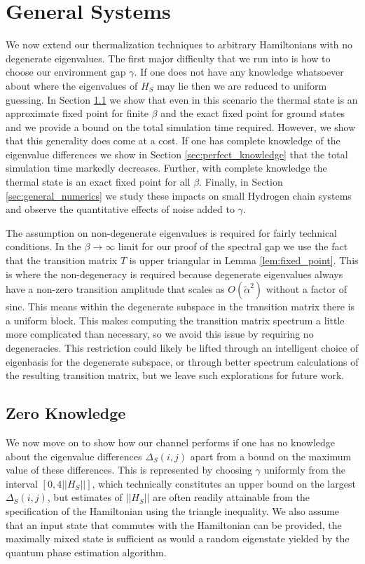 \documentclass[
 amsmath,amssymb,
 aps,
onecolumn, 
nofootinbib]{revtex4-2}
\newcommand{\norm}[1]{\left|\left| #1 \right|\right|}
\newcommand{\bigo}[1]{O\left(#1\right)}
\begin{document}
\section{General Systems} \label{sec:general_systems}

We now extend our thermalization techniques to arbitrary Hamiltonians with no degenerate eigenvalues. The first major difficulty that we run into is how to choose our environment gap $\gamma$. If one does not have any knowledge whatsoever about where the eigenvalues of $H_S$ may lie then we are reduced to uniform guessing. In Section \ref{sec:zero_knowledge} we show that even in this scenario the thermal state is an approximate fixed point for finite $\beta$ and the exact fixed point for ground states and we provide a bound on the total simulation time required. However, we show that this generality does come at a cost. If one has complete knowledge of the eigenvalue differences we show in Section \ref{sec:perfect_knowledge} that the total simulation time markedly decreases. Further, with complete knowledge the thermal state is an exact fixed point for all $\beta$. Finally, in Section \ref{sec:general_numerics} we study these impacts on small Hydrogen chain systems and observe the quantitative effects of noise added to $\gamma$. 

The assumption on non-degenerate eigenvalues is required for fairly technical conditions. In the $\beta \to \infty$ limit for our proof of the spectral gap we use the fact that the transition matrix $T$ is upper triangular in Lemma \ref{lem:fixed_point}. This is where the non-degeneracy is required because degenerate eigenvalues always have a non-zero transition amplitude that scales as $\bigo{\widetilde{\alpha}^2}$ without a factor of sinc. This means within the degenerate subspace in the transition matrix there is a uniform block. This makes computing the transition matrix spectrum a little more complicated than necessary, so we avoid this issue by requiring no degeneracies. This restriction could likely be lifted through an intelligent choice of eigenbasis for the degenerate subspace, or through better spectrum calculations of the resulting transition matrix, but we leave such explorations for future work. 



\subsection{Zero Knowledge} \label{sec:zero_knowledge}
We now move on to show how our channel performs if one has no knowledge about the eigenvalue differences $\Delta_S(i,j)$ apart from a bound on the maximum value of these differences. This is represented by choosing $\gamma$ uniformly from the interval $[0, 4 \norm{H_S}]$, which technically constitutes an upper bound on the largest $\Delta_S(i,j)$, but estimates of $\norm{H_S}$ are often readily attainable from the specification of the Hamiltonian using the triangle inequality.  We also assume that an input state that commutes with the Hamiltonian can be provided, the maximally mixed state is sufficient as would a random eigenstate yielded by the quantum phase estimation algorithm.
\end{document}
